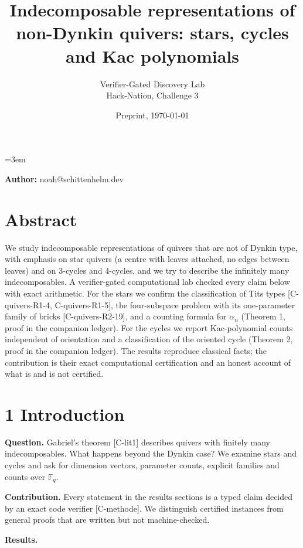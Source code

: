 \documentclass[10pt,twocolumn]{article}
\title{\textbf{Indecomposable representations of non-Dynkin quivers: stars, cycles and Kac polynomials}}
\author{Verifier-Gated Discovery Lab\\ \small Hack-Nation, Challenge 3}
\date{Preprint, \today}
\begin{document}
\maketitle\sloppy\emergencystretch=3em


\textbf{Author:} noah@schittenhelm.dev

\section*{Abstract}

We study indecomposable representations of quivers that are not of Dynkin type, with emphasis on star quivers (a centre with leaves attached, no edges between leaves) and on 3-cycles and 4-cycles, and we try to describe the infinitely many indecomposables. A verifier-gated computational lab checked every claim below with exact arithmetic. For the stars we confirm the classification of Tits types {\scriptsize[C-quivers-R1-4, C-quivers-R1-5]}, the four-subspace problem with its one-parameter family of bricks {\scriptsize[C-quivers-R2-19]}, and a counting formula for $\alpha_n$ (Theorem 1, proof in the companion ledger). For the cycles we report Kac-polynomial counts independent of orientation and a classification of the oriented cycle (Theorem 2, proof in the companion ledger). The results reproduce classical facts; the contribution is their exact computational certification and an honest account of what is and is not certified.

\section*{1 Introduction}

\textbf{Question.} Gabriel's theorem {\scriptsize[C-lit1]} describes quivers with finitely many indecomposables. What happens beyond the Dynkin case? We examine stars and cycles and ask for dimension vectors, parameter counts, explicit families and counts over $\mathbb F_q$.

\textbf{Contribution.} Every statement in the results sections is a typed claim decided by an exact code verifier {\scriptsize[C-methode]}. We distinguish certified instances from general proofs that are written but not machine-checked.

\textbf{Results.}
\end{document}

